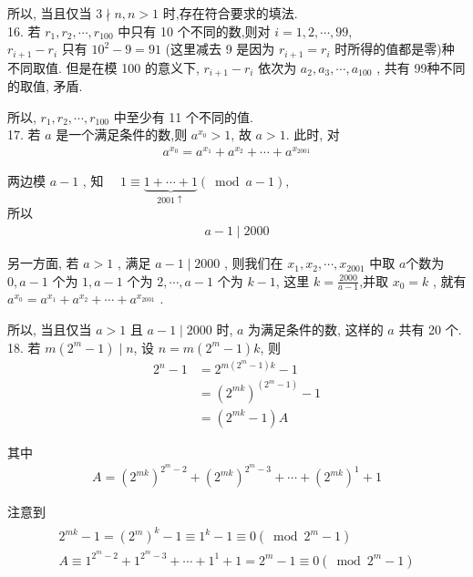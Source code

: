 所以, 当且仅当 $3 \nmid n, n>1$ 时,存在符合要求的填法.\\
16. 若 $r_{1}, r_{2}, \cdots, r_{100}$ 中只有 10 个不同的数,则对 $i=1,2, \cdots, 99$,\\
$r_{i+1}-r_{i}$ 只有 $10^{2}-9=91$ (这里减去 9 是因为 $r_{i+1}=r_{i}$ 时所得的值都是零)种不同取值. 但是在模 100 的意义下,  $r_{i+1}-r_{i}$ 依次为 $a_{2}, a_{3}, \cdots, a_{100}$ , 共有 99种不同的取值, 矛盾.

所以,  $r_{1}, r_{2}, \cdots, r_{100}$ 中至少有 11 个不同的值.\\
17. 若 $a$ 是一个满足条件的数,则 $a^{x_{0}}>1$, 故 $a>1$. 此时, 对
\begin{align*}
	a^{x_{0}}=a^{x_{1}}+a^{x_{2}}+\cdots+a^{x_{2001}}
\end{align*}

两边模 $a-1$ , 知 $\quad 1 \equiv \underbrace{1+\cdots+1}_{2001 \uparrow}(\bmod a-1) , $\\
所以
\begin{align*}
	a-1 \mid 2000
\end{align*}

另一方面, 若 $a>1$ , 满足 $a-1 \mid 2000$ , 则我们在 $x_{1}, x_{2}, \cdots, x_{2001}$ 中取 $a$个数为 $0, a-1$ 个为 $1, a-1$ 个为 $2, \cdots, a-1$ 个为 $k-1$, 这里 $k=\frac{2000}{a-1}$,并取 $x_{0}=k$ , 就有 $a^{x_{0}}=a^{x_{1}}+a^{x_{2}}+\cdots+a^{x_{2001}}$ .

所以, 当且仅当 $a>1$ 且 $a-1 \mid 2000$ 时, $a$ 为满足条件的数, 这样的 $a$ 共有 20 个.\\
18. 若 $m\left(2^{m}-1\right) \mid n$, 设 $n=m\left(2^{m}-1\right) k$, 则\begin{align}
	2^{n}-1 & =2^{m\left(2^{m}-1\right) k}-1                 \\
	        & =\left(2^{m k}\right)^{\left(2^{m}-1\right)}-1 \\
	        & =\left(2^{m k}-1\right) A
\end{align}

其中
\begin{align*}
	A=\left(2^{m k}\right)^{2^{m}-2}+\left(2^{m k}\right)^{2^{m}-3}+\cdots+\left(2^{m k}\right)^{1}+1
\end{align*}

注意到
\begin{align*}
	\begin{gathered}
		2^{m k}-1=\left(2^{m}\right)^{k}-1 \equiv 1^{k}-1 \equiv 0\left(\bmod 2^{m}-1\right) \\
		A \equiv 1^{2^{m}-2}+1^{2^{m}-3}+\cdots+1^{1}+1=2^{m}-1 \equiv 0\left(\bmod 2^{m}-1\right)
	\end{gathered}
\end{align*}

